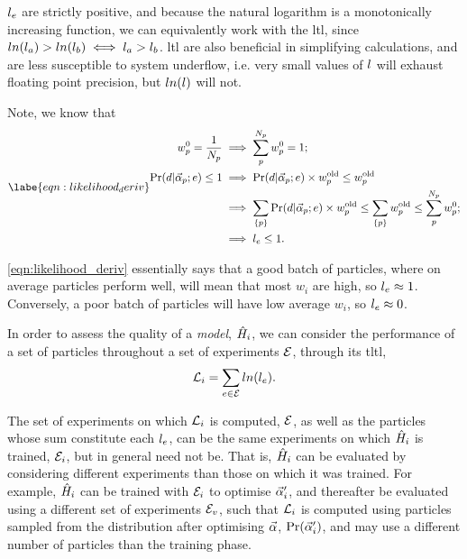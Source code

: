 $l_{e}$ are strictly positive, and because the natural logarithm is a monotonically increasing function, 
    we can equivalently work with the \gls{ltl}, 
    since $ln(l_a) > ln(l_b) \iff l_a > l_b$. 
\gls{ltl} are also beneficial in simplifying calculations, 
    and are less susceptible to system underflow, 
    i.e. very small values of $l$ will exhaust floating point precision, 
    but $ln(l)$ will not. 
\par 

Note, we know that
\begin{align}    
    \labe{eqn:likelihood_deriv}
    \begin{split}
        w_p^0 = \frac{1}{\Np} & \implies \sum_p^{\Np} w_p^0 = 1 ; \\
        \Pr(d | \al_p; e) \leq 1 & \implies \Pr(d | \al_p; e) \times w_p^{\textrm{old}} \leq w_p^{\textrm{old}} \\
        & \implies \sum\limits_{\{p\}} \Pr(d | \al_p; e) \times w_p^{\textrm{old}} \leq \sum\limits_{\{p\}} w_p^{\textrm{old}} \leq \sum_p^{\Np} w_p^0; \\
        & \implies \lk_{e} \leq 1.
    \end{split}
\end{align}

\cref{eqn:likelihood_deriv} essentially says that a good batch of particles, 
    where on average particles perform well, 
    will mean that most $w_i$ are high, so $l_{e} \approx 1$. 
Conversely, a poor batch of particles will have low average $w_i$, so $l_{e} \approx 0$. 
\par

In order to assess the quality of a \emph{model}, $\hat{H}_i$, 
    we can consider the performance of a set of particles throughout a set of experiments ${ \mathcal{E} }$, 
    through its \gls{tltl}, 
\begin{equation}
    \label{eqn:log_total_likelihood}
    {\mathcal{L}}_{i} = \sum\limits_{e \in { \mathcal{E} }} ln(l_{e}).    
\end{equation}

The set of experiments on which ${\mathcal{L}}_{i}$ is computed, ${ \mathcal{E} }$, 
    as well as the particles whose sum constitute each $l_{e}$,
    can be the same experiments on which $\hat{H}_i$ is trained, ${ \mathcal{E} }_i$, but in general need not be.
That is, $\hat{H}_i$ can be evaluated by considering different experiments than those on which it was trained.
For example, $\hat{H}_i$ can be trained with ${ \mathcal{E} }_i$ to optimise $\vec{\alpha}_i^{\prime}$, 
    and thereafter be evaluated using a different set of experiments ${ \mathcal{E} }_v$, 
    such that ${\mathcal{L}}_{i}$ is computed using particles sampled from the distribution after optimising $\vec{\alpha}$, 
    $\Pr(\vec{\alpha}_i^{\prime})$, and may use a different number of particles than the training phase. 
\par 

